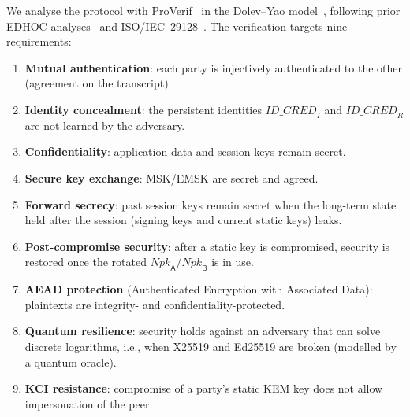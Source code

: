 \documentclass[symmetry,article,submit,moreauthors]{Definitions/mdpi}
\begin{document}
We analyse the protocol with ProVerif~\cite{blanchet2001proverif,blanchet2016automated} in the Dolev--Yao model~\cite{DolevYao1983,dolev1983security}, following prior EDHOC analyses~\cite{JKK+23,NSB21,KDL+21,Fer24,cremers2017symbolic} and ISO/IEC~29128~\cite{ISO29128}. The verification targets nine requirements:
\begin{enumerate}[label=R\arabic*,ref=\arabic*,leftmargin=2.6em]
\item \label{req:mutualauth} \textbf{Mutual authentication}: each party is injectively authenticated to the other (agreement on the transcript).
\item \label{req:idconceal} \textbf{Identity concealment}: the persistent identities $\mathit{ID\_CRED}_I$ and $\mathit{ID\_CRED}_R$ are not learned by the adversary.
\item \label{req:confidentiality} \textbf{Confidentiality}: application data and session keys remain secret.
\item \label{req:keyexchange} \textbf{Secure key exchange}: MSK/EMSK are secret and agreed.
\item \label{req:fs} \textbf{Forward secrecy}: past session keys remain secret when the long-term state held after the session (signing keys and current static keys) leaks.
\item \label{req:pcs} \textbf{Post-compromise security}: after a static key is compromised, security is restored once the rotated $\mathit{Npk}_{\mathsf{A}}/\mathit{Npk}_{\mathsf{B}}$ is in use.
\item \label{req:aead} \textbf{AEAD protection} (Authenticated Encryption with Associated Data): plaintexts are integrity- and confidentiality-protected.
\item \label{req:qr} \textbf{Quantum resilience}: security holds against an adversary that can solve discrete logarithms, i.e., when X25519 and Ed25519 are broken (modelled by a quantum oracle).
\item \label{req:kci} \textbf{KCI resistance}: compromise of a party's static KEM key does not allow impersonation of the peer.
\end{enumerate}
\end{document}
